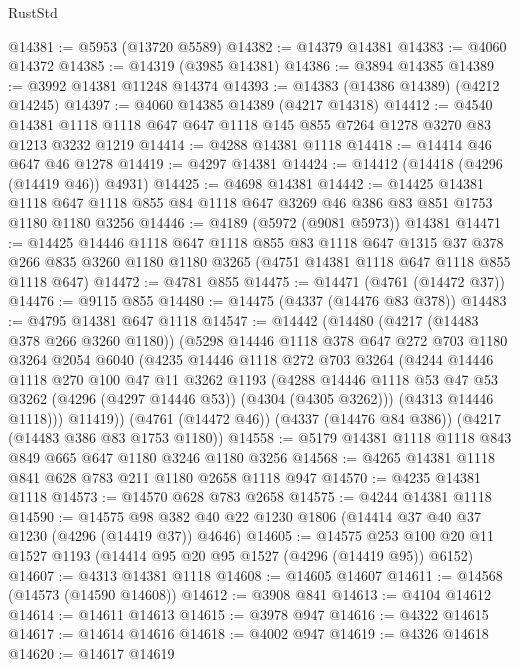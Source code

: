 \begin{lexlean}{RustStd}
\begin{coremodule}
@14381 := @5953 (@13720 @5589)
@14382 := @14379 @14381
@14383 := @4060 @14372
@14385 := @14319 (@3985 @14381)
@14386 := @3894 @14385
@14389 := @3992 @14381 @11248 @14374
@14393 := @14383 (@14386 @14389) (@4212 @14245)
@14397 := @4060 @14385 @14389 (@4217 @14318)
@14412 := @4540 @14381 @1118 @1118 @647 @647 @1118 @145 @855 @7264 @1278 @3270 @83 @1213 @3232 @1219
@14414 := @4288 @14381 @1118
@14418 := @14414 @46 @647 @46 @1278
@14419 := @4297 @14381
@14424 := @14412 (@14418 (@4296 (@14419 @46)) @4931)
@14425 := @4698 @14381
@14442 := @14425
    @14381
    @1118
    @647
    @1118
    @855
    @84
    @1118
    @647
    @3269
    @46
    @386
    @83
    @851
    @1753
    @1180
    @1180
    @3256
@14446 := @4189 (@5972 (@9081 @5973)) @14381
@14471 := @14425
    @14446
    @1118
    @647
    @1118
    @855
    @83
    @1118
    @647
    @1315
    @37
    @378
    @266
    @835
    @3260
    @1180
    @1180
    @3265
    (@4751 @14381 @1118 @647 @1118 @855 @1118 @647)
@14472 := @4781 @855
@14475 := @14471 (@4761 (@14472 @37))
@14476 := @9115 @855
@14480 := @14475 (@4337 (@14476 @83 @378))
@14483 := @4795 @14381 @647 @1118
@14547 := @14442
    (@14480
      (@4217 (@14483 @378 @266 @3260 @1180))
      (@5298
        @14446
        @1118
        @378
        @647
        @272
        @703
        @1180
        @3264
        @2054
        @6040
        (@4235
          @14446
          @1118
          @272
          @703
          @3264
          (@4244
            @14446
            @1118
            @270
            @100
            @47
            @11
            @3262
            @1193
            (@4288 @14446 @1118 @53 @47 @53 @3262 (@4296 (@4297 @14446 @53)) (@4304 (@4305 @3262)))
            (@4313 @14446 @1118)))
        @11419))
    (@4761 (@14472 @46))
    (@4337 (@14476 @84 @386))
    (@4217 (@14483 @386 @83 @1753 @1180))
@14558 := @5179 @14381 @1118 @1118 @843 @849 @665 @647 @1180 @3246 @1180 @3256
@14568 := @4265 @14381 @1118 @841 @628 @783 @211 @1180 @2658 @1118 @947
@14570 := @4235 @14381 @1118
@14573 := @14570 @628 @783 @2658
@14575 := @4244 @14381 @1118
@14590 := @14575 @98 @382 @40 @22 @1230 @1806 (@14414 @37 @40 @37 @1230 (@4296 (@14419 @37)) @4646)
@14605 := @14575 @253 @100 @20 @11 @1527 @1193 (@14414 @95 @20 @95 @1527 (@4296 (@14419 @95)) @6152)
@14607 := @4313 @14381 @1118
@14608 := @14605 @14607
@14611 := @14568 (@14573 (@14590 @14608))
@14612 := @3908 @841
@14613 := @4104 @14612
@14614 := @14611 @14613
@14615 := @3978 @947
@14616 := @4322 @14615
@14617 := @14614 @14616
@14618 := @4002 @947
@14619 := @4326 @14618
@14620 := @14617 @14619

\end{coremodule}
\end{lexlean}
